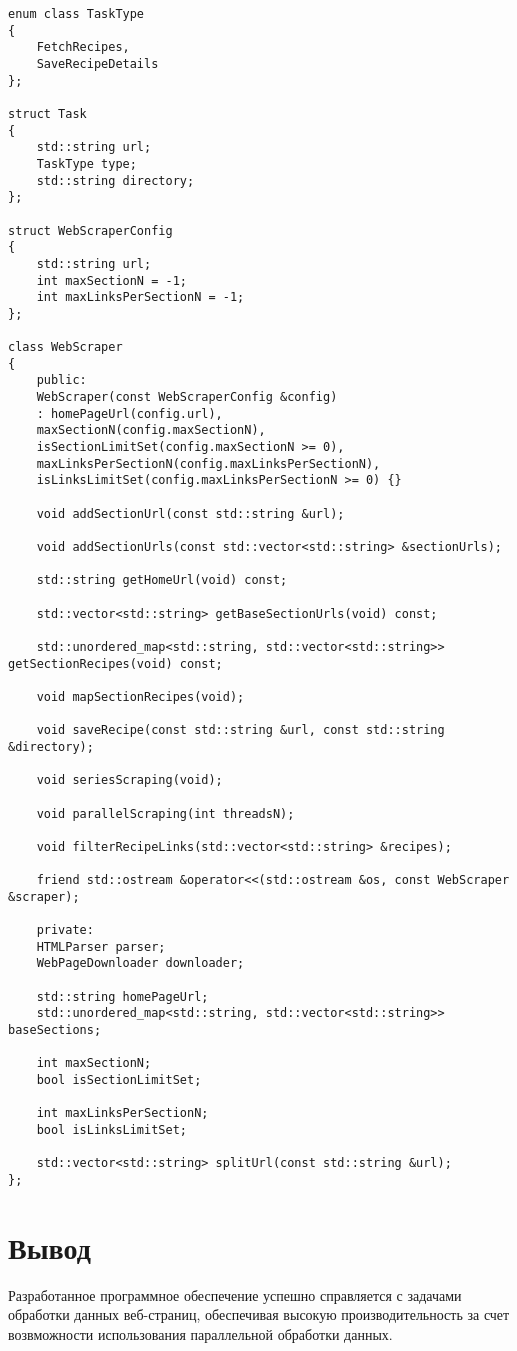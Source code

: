 \begin{center}
	\captionsetup{justification=raggedright,singlelinecheck=off}
	\begin{lstlisting}[caption=Интерфейс класса WebScraper]
enum class TaskType
{
	FetchRecipes,
	SaveRecipeDetails
};

struct Task
{
	std::string url;
	TaskType type;
	std::string directory;
};

struct WebScraperConfig
{
	std::string url;
	int maxSectionN = -1;
	int maxLinksPerSectionN = -1;
};

class WebScraper
{
	public:
	WebScraper(const WebScraperConfig &config)
	: homePageUrl(config.url),
	maxSectionN(config.maxSectionN),
	isSectionLimitSet(config.maxSectionN >= 0),
	maxLinksPerSectionN(config.maxLinksPerSectionN),
	isLinksLimitSet(config.maxLinksPerSectionN >= 0) {}
	
	void addSectionUrl(const std::string &url);
	
	void addSectionUrls(const std::vector<std::string> &sectionUrls);
	
	std::string getHomeUrl(void) const;
	
	std::vector<std::string> getBaseSectionUrls(void) const;
	
	std::unordered_map<std::string, std::vector<std::string>> getSectionRecipes(void) const;
	
	void mapSectionRecipes(void);
	
	void saveRecipe(const std::string &url, const std::string &directory);
	
	void seriesScraping(void);
	
	void parallelScraping(int threadsN);
	
	void filterRecipeLinks(std::vector<std::string> &recipes);
	
	friend std::ostream &operator<<(std::ostream &os, const WebScraper &scraper);
	
	private:
	HTMLParser parser;
	WebPageDownloader downloader;
	
	std::string homePageUrl;
	std::unordered_map<std::string, std::vector<std::string>> baseSections;
	
	int maxSectionN;
	bool isSectionLimitSet;
	
	int maxLinksPerSectionN;
	bool isLinksLimitSet;
	
	std::vector<std::string> splitUrl(const std::string &url);
};
	\end{lstlisting}
\end{center}

\section*{Вывод}
Разработанное программное обеспечение успешно справляется с задачами обработки данных веб-страниц, обеспечивая высокую производительность за счет возвможности использования параллельной обработки данных.
